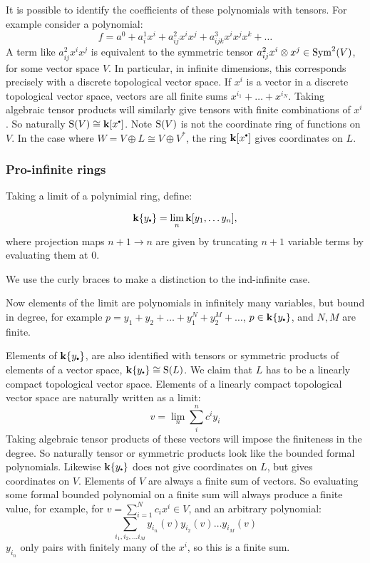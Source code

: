     It is possible to identify the coefficients of these polynomials with tensors. For example consider a polynomial: 
    \[ f = a^0 + a^1_{i}x^i + a^2_{ij} x^i x^j + a^3_{ijk} x^i x^j x^k + \dots \]
    A term like \(a^2_{ij}x^i x^j\) is equivalent to the symmetric tensor \( a^2_{ij} x^i \otimes x^j \in \mathrm{Sym}^2(V)\), for some vector space \(V\). In particular, in infinite dimensions, this corresponds precisely with a discrete topological vector space. If \(x^i\) is a vector in a discrete topological vector space, vectors are all finite sums \(x^{i_1} + \dots + x^{i_N}\). Taking algebraic tensor products will similarly give tensors with finite combinations of \(x^i\). So naturally
    \( \rS(V) \cong \mathbf{k}[x^{\sbt}] \). Note \(\mathrm{S}(V)\) is not the coordinate ring of functions on \(V\). In the case where \(W = V \oplus L \cong V \oplus V^*\), the ring \( \mathbf{k}[x^{\sbt}] \) gives coordinates on \(L\).
    
    
    \subsubsection{Pro-infinite rings}
    
    Taking a limit of a polynimial ring, define:
    \begin{defn}
    \[ \mathbf{k}\{y_{\sbt}\} =  \lim_n\mathbf{k}[y_{1}, \dots y_n],\]
    where projection maps \(n+1 \rightarrow n\) are given by truncating \(n+1\) variable terms by evaluating them at \(0\). 
    \end{defn}
    We use the curly braces to make a distinction to the ind-infinite case.
    
    Now elements of the limit are polynomials in infinitely many variables, but bound in degree, for example \( p = y_1 + y_2 + \dots + y_1^N + y_2^M + \dots \), \( p \in \mathbf{k}\{y_{\sbt}\}\), and \(N, M\) are finite.

    Elements of \( \mathbf{k}\{y_{\sbt} \}\), are also identified with tensors or symmetric products of elements of a vector space, \( \mathbf{k}\{y_{\sbt}\} \cong \rS(L)\). We claim that \(L\) has to be a linearly compact topological vector space. Elements of a linearly compact topological vector space are naturally written as a limit:
    \[ v= \lim_{n} \sum^{n}_{i} c^i y_i\]
    Taking algebraic tensor products of these vectors will impose the finiteness in the degree. So naturally tensor or symmetric products look like the bounded formal polynomials. Likewise \( \mathbf{k}\{y_{\sbt}\}\) does not give coordinates on \(L\), but gives coordinates on \(V\). Elements of \(V\) are always a finite sum of vectors. So evaluating some formal bounded polynomial on a finite sum will always produce a finite value, for example, for \(v = \sum_{i=1}^N c_i x^i \in V\), and an arbitrary polynomial:
    \[ \sum_{i_1, i_2, \dots i_M} y_{i_n} (v) y_{i_2}(v) \dots y_{i_M}(v) \]
    \(y_{i_n}\) only pairs with finitely many of the \(x^i\), so this is a finite sum.

